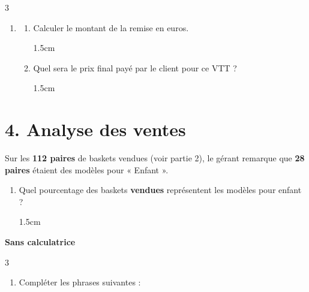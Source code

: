 \documentclass[a4paper]{book}
\begin{document}
{\begin{exerciceNote}{3}
        \begin{enumerate}[resume, leftmargin=*]
            \item \begin{enumerate}[label=\alph*), leftmargin=*]
                \item Calculer le montant de la remise en euros.
                
                \begin{ZoneReponse}{1.5cm}                
                \end{ZoneReponse}
                
                \item Quel sera le prix final payé par le client pour ce VTT ?
                
                \begin{ZoneReponse}{1.5cm}                
                \end{ZoneReponse}
            \end{enumerate}
        \end{enumerate}
        
        \section*{4. Analyse des ventes}
        Sur les \textbf{112 paires} de baskets vendues (voir partie 2), le gérant remarque que \textbf{28 paires} étaient des modèles pour « Enfant ».
        
        \begin{enumerate}[resume, leftmargin=*]
            \item Quel pourcentage des baskets \textbf{vendues} représentent les modèles pour enfant ?
            
            \begin{ZoneReponse}{1.5cm}                
            \end{ZoneReponse}
        \end{enumerate}  
    \end{exerciceNote}


\newpage

\setcounter{exo}{1}
\raggedright
\NomPrenom
{}
\TableauCompetencesQuatre
            {\CompetenceSept}
            {}
            {}
            {}
            
\textbf{Sans calculatrice}

    \begin{exerciceNote}{3}
        \begin{enumerate}[leftmargin=*]
            \item Compléter les phrases suivantes :
    

\end{enumerate}
\end{exerciceNote}}
\end{document}
